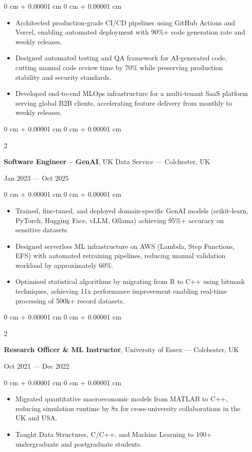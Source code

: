 \documentclass[6pt, letterpaper]{article}
\newenvironment{highlights}{
    \begin{itemize}[
        topsep=0.03 cm,
        parsep=0.03 cm,
        partopsep=0pt,
        itemsep=0pt,
        leftmargin=0 cm + 10pt
    ]
}{
    \end{itemize}
} %
\newenvironment{onecolentry}{
    \begin{adjustwidth}{
        0 cm + 0.00001 cm
    }{
        0 cm + 0.00001 cm
    }
}{
    \end{adjustwidth}
} %
\newenvironment{twocolentry}[2][]{
    \onecolentry
    \def\secondColumn{#2}
    \setcolumnwidth{\fill, 4.5 cm}
    \begin{paracol}{2}
}{
    \switchcolumn \raggedleft \secondColumn
    \end{paracol}
    \endonecolentry
} %
\begin{document}
        \begin{onecolentry}
        \begin{highlights}
            \item Architected production-grade CI/CD pipelines using GitHub Actions and Vercel, enabling automated deployment with 90\%+ code generation rate and weekly releases.
            \item Designed automated testing and QA framework for AI-generated code, cutting manual code review time by 70\% while preserving production stability and security standards.
            \item Developed end-to-end MLOps infrastructure for a multi-tenant SaaS platform serving global B2B clients, accelerating feature delivery from monthly to weekly releases.
        \end{highlights}
        \end{onecolentry}

        \begin{twocolentry}{Jan 2023 --- Oct 2025}
        \textbf{Software Engineer – GenAI}, UK Data Service --- Colchester, UK
        \end{twocolentry}

        \begin{onecolentry}
        \begin{highlights}

            \item Trained, fine-tuned, and deployed domain-specific GenAI models (scikit-learn, PyTorch, Hugging Face, vLLM, Ollama) achieving 95\%+ accuracy on sensitive datasets.
            \item Designed serverless ML infrastructure on AWS (Lambda, Step Functions, EFS) with automated retraining pipelines, reducing manual validation workload by approximately 60\%.
            \item Optimised statistical algorithms by migrating from R to C++ using bitmask techniques, achieving 11x performance improvement enabling real-time processing of 500k+ record datasets.
        \end{highlights}
        \end{onecolentry}

        \begin{twocolentry}{Oct 2021 --- Dec 2022}
        \textbf{Research Officer \& ML Instructor}, University of Essex --- Colchester, UK
        \end{twocolentry}

        \begin{onecolentry}
        \begin{highlights}
        \item Migrated quantitative macroeconomic models from MATLAB to C++, reducing simulation runtime by 8x for cross-university collaborations in the UK and USA.
        \item Taught Data Structures, C/C++, and Machine Learning to 100+ undergraduate and postgraduate students.
        \end{highlights}
        \end{onecolentry}
\end{document}
